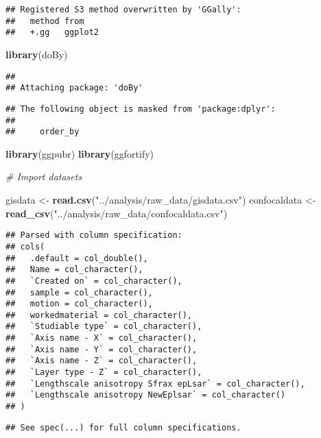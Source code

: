 \documentclass[
]{article}
\newenvironment{Shaded}{\begin{snugshade}}{\end{snugshade}}
\newcommand{\CommentTok}[1]{\textcolor[rgb]{0.56,0.35,0.01}{\textit{#1}}}
\newcommand{\KeywordTok}[1]{\textcolor[rgb]{0.13,0.29,0.53}{\textbf{#1}}}
\newcommand{\NormalTok}[1]{#1}
\newcommand{\StringTok}[1]{\textcolor[rgb]{0.31,0.60,0.02}{#1}}
\begin{document}
\begin{verbatim}
## Registered S3 method overwritten by 'GGally':
##   method from   
##   +.gg   ggplot2
\end{verbatim}

\begin{Shaded}
\begin{Highlighting}[]
\KeywordTok{library}\NormalTok{(doBy)}
\end{Highlighting}
\end{Shaded}

\begin{verbatim}
## 
## Attaching package: 'doBy'
\end{verbatim}

\begin{verbatim}
## The following object is masked from 'package:dplyr':
## 
##     order_by
\end{verbatim}

\begin{Shaded}
\begin{Highlighting}[]
\KeywordTok{library}\NormalTok{(ggpubr)}
\KeywordTok{library}\NormalTok{(ggfortify)}

\CommentTok{# Import datasets}

\NormalTok{gisdata <-}\StringTok{ }\KeywordTok{read.csv}\NormalTok{(}\StringTok{"../analysis/raw_data/gisdata.csv"}\NormalTok{)}
\NormalTok{confocaldata <-}\StringTok{ }\KeywordTok{read_csv}\NormalTok{(}\StringTok{"../analysis/raw_data/confocaldata.csv"}\NormalTok{)}
\end{Highlighting}
\end{Shaded}

\begin{verbatim}
## Parsed with column specification:
## cols(
##   .default = col_double(),
##   Name = col_character(),
##   `Created on` = col_character(),
##   sample = col_character(),
##   motion = col_character(),
##   workedmaterial = col_character(),
##   `Studiable type` = col_character(),
##   `Axis name - X` = col_character(),
##   `Axis name - Y` = col_character(),
##   `Axis name - Z` = col_character(),
##   `Layer type - Z` = col_character(),
##   `Lengthscale anisotropy Sfrax epLsar` = col_character(),
##   `Lengthscale anisotropy NewEplsar` = col_character()
## )
\end{verbatim}

\begin{verbatim}
## See spec(...) for full column specifications.
\end{verbatim}
\end{document}
